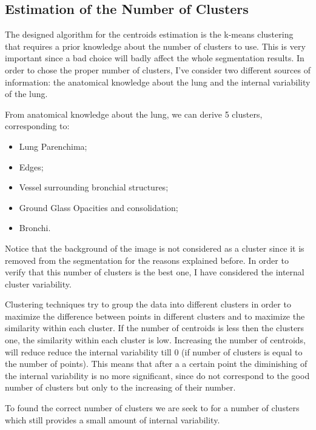 \documentclass{standalone}
\begin{document}
	\subsection{Estimation of the Number of Clusters}
	
	The designed algorithm for the centroids estimation is the k-means clustering that requires a prior knowledge about the number of clusters to use. This is very important since a bad choice will badly affect the whole segmentation results. In order to chose the proper number of clusters, I've consider two different sources of information: the anatomical knowledge about the lung and the internal variability of the lung.
	
	From anatomical knowledge about the lung, we can derive 5 clusters, corresponding to: 
	
	\begin{itemize}
		\item Lung Parenchima; 
		
		\item  Edges;
		
		\item Vessel surrounding bronchial structures;
		
		\item  Ground Glass Opacities and consolidation;
		
		\item Bronchi.
	\end{itemize}

	Notice that the background of the image is not considered as a cluster since it is removed from the segmentation for the reasons explained before.
	In order to verify that this number of clusters is the best one, I have considered the internal cluster variability.
	
	Clustering techniques try to group the data into different clusters  in order to maximize the difference between points in different clusters and to maximize the similarity within each cluster.  If the number of centroids is less then the clusters one, the similarity within each cluster is low. Increasing the number of centroids, will reduce reduce the internal variability till $0$ (if number of clusters is equal to the number of points). 
	This means that after a a certain point the diminishing of the internal variability is no more significant, since do not correspond to the good number of clusters but only to the increasing of their number.
	
	To found the correct number of clusters we are seek to for a number of clusters which still provides a small amount of internal variability. 
	
\end{document}
